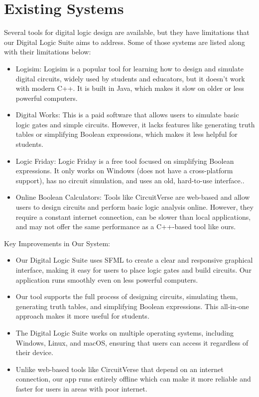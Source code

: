 \section{Existing Systems}
Several tools for digital logic design are available, but they have limitations that our Digital Logic Suite aims to address. Some of those systems are listed along with their limitations below:

\begin{itemize}
    \item Logisim: Logisim is a popular tool for learning how to design and simulate digital circuits, widely used by students and educators, but it doesn't work with modern C++. It is built in Java, which makes it slow on older or less powerful computers.
    \item Digital Works: This is a paid software that allows users to simulate basic logic gates and simple circuits. However, it lacks features like generating truth tables or simplifying Boolean expressions, which makes it less helpful for students.
    \item Logic Friday: Logic Friday is a free tool focused on simplifying Boolean expressions. It only works on Windows (does not have a cross-platform support), has no circuit simulation, and uses an old, hard-to-use interface..
    \item Online Boolean Calculators: Tools like CircuitVerse are web-based and allow users to design circuits and perform basic logic analysis online. However, they require a constant internet connection, can be slower than local applications, and may not offer the same performance as a C++-based tool like ours.
\end{itemize}
\clearpage
Key Improvements in Our System:
\begin{itemize}
    \item Our Digital Logic Suite uses SFML to create a clear and responsive graphical interface, making it easy for users to place logic gates and build circuits. Our application runs smoothly even on less powerful computers.
    \item Our tool supports the full process of designing circuits, simulating them, generating truth tables, and simplifying Boolean expressions. This all-in-one approach makes it more useful for students.
    \item The Digital Logic Suite works on multiple operating systems, including Windows, Linux, and macOS, ensuring that users can access it regardless of their device.
    \item Unlike web-based tools like CircuitVerse that depend on an internet connection, our app runs entirely offline which can make it more reliable and faster for users in areas with poor internet.
\end{itemize}
\clearpage